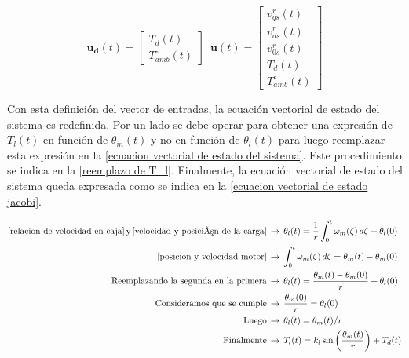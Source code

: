 \documentclass[a4paper, 10pt, onecolumn,journal]{ieeeconf}
\begin{document}
\begin{equation}
    \mathbf{u_{d}}(t) = \begin{bmatrix} T_d(t) \\ T_{amb}^{\circ}(t)\end{bmatrix}\, \, \, 
    \mathbf{u}(t) = \begin{bmatrix} v^r_{qs}(t) \\ v^r_{ds}(t) \\ v^r_{0s}(t) \\ T_d(t) \\ T_{amb}^{\circ}(t) \end{bmatrix}
    \label{vector de entradas jacobi linealizado}
\end{equation}

Con esta definición del vector de entradas, la ecuación vectorial de estado del sistema es redefinida.
Por un lado se debe operar para obtener una expresión de $T_l(t)$ en función de $\theta_m(t)$ y no en función de 
$\theta_l(t)$ para luego reemplazar esta expresión en la \cref{ecuacion vectorial de estado del sistema}.
Este procedimiento se indica en la \cref{reemplazo de T_l}. Finalmente, la ecuación vectorial de estado del sistema queda expresada
como se indica en la \cref{ecuacion vectorial de estado jacobi}.

\begin{equation}
    \begin{aligned}
        \cref{relacion de velocidad en caja} \,\text{y}\, \cref{velocidad y posición de la carga}\,&\rightarrow\,\theta_l(t) = \frac{1}{r} \int_{0}^{t} \omega_m(\zeta) \, d\zeta + \theta_l(0)\\
        \cref{posicion y velocidad motor}\,&\rightarrow\,  \int_{0}^{t} \omega_m(\zeta) \, d\zeta = \theta_m(t) - \theta_m(0)\\
        \text{Reemplazando la segunda en la primera}\,&\rightarrow\,\theta_l(t) = \frac{\theta_m(t) - \theta_m(0)}{r} + \theta_l(0)\\
        \text{Consideramos que se cumple}\,&\rightarrow\,\frac{\theta_m(0)}{r} = \theta_l(0)\\
        \text{Luego}\,&\rightarrow\,\theta_l(t) = \theta_m(t)/r\\
        \text{Finalmente}\,&\rightarrow\,T_l(t) = k_l\sin\left(\frac{\theta_m(t)}{r}\right) + T_d(t)
    \end{aligned}
    \label{reemplazo de T_l}
\end{equation}
\end{document}
